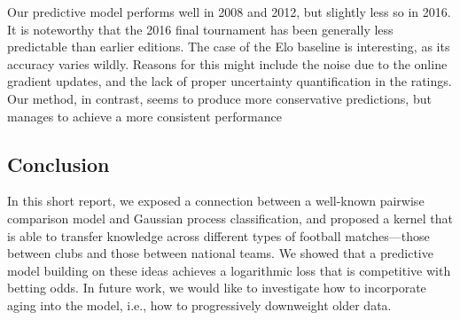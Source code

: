 Our predictive model performs well in 2008 and 2012, but slightly less so in 2016.
It is noteworthy that the 2016 final tournament has been generally less predictable than earlier editions.
The case of the Elo baseline is interesting, as its accuracy varies wildly.
Reasons for this might include the noise due to the online gradient updates, and the lack of proper uncertainty quantification in the ratings.
Our method, in contrast, seems to produce more conservative predictions, but manages to achieve a more consistent performance


\subsection{Conclusion}

In this short report, we exposed a connection between a well-known pairwise comparison model and Gaussian process classification, and proposed a kernel that is able to transfer knowledge across different types of football matches---those between clubs and those between national teams.
We showed that a predictive model building on these ideas achieves a logarithmic loss that is competitive with betting odds.
In future work, we would like to investigate how to incorporate aging into the model, i.e., how to progressively downweight older data.
